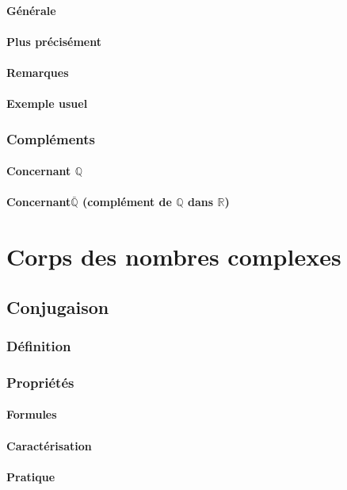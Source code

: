 \documentclass[12pt,a4paper,french]{book}
\begin{document}
			\subsubsection{Générale}
			\subsubsection{Plus précisément}
			\subsubsection{Remarques}
			\subsubsection{Exemple usuel}
		\subsection{Compléments}
			\subsubsection{Concernant $\mathbb{Q}$}
			\subsubsection{Concernant$\bar{\mathbb{Q}}$ (complément de $\mathbb{Q}$ dans $\mathbb{R}$)}
			
			
\chapter{Corps des nombres complexes}
	\section{Conjugaison}
		\subsection{Définition}
		\subsection{Propriétés}
			\subsubsection{Formules}
			\subsubsection{Caractérisation}
			\subsubsection{Pratique}
\end{document}
